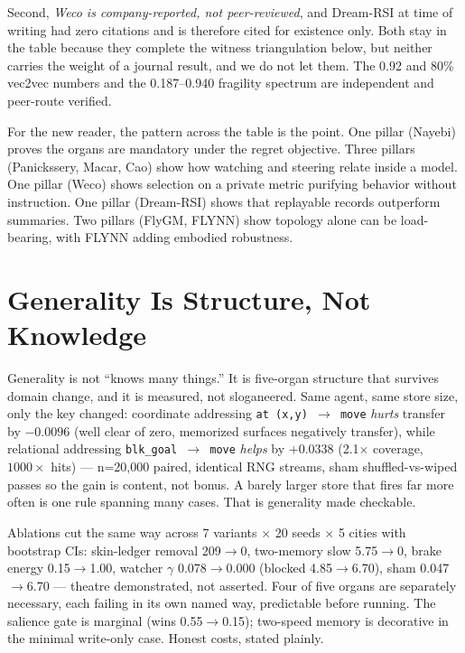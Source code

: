 Second, \textit{Weco is company-reported, not peer-reviewed}, and Dream-RSI at time of writing had zero citations and is therefore cited for existence only. Both stay in the table because they complete the witness triangulation below, but neither carries the weight of a journal result, and we do not let them. The 0.92 and 80\% vec2vec numbers and the 0.187--0.940 fragility spectrum are independent and peer-route verified.

For the new reader, the pattern across the table is the point. One pillar (Nayebi) proves the organs are mandatory under the regret objective. Three pillars (Panickssery, Macar, Cao) show how watching and steering relate inside a model. One pillar (Weco) shows selection on a private metric purifying behavior without instruction. One pillar (Dream-RSI) shows that replayable records outperform summaries. Two pillars (FlyGM, FLYNN) show topology alone can be load-bearing, with FLYNN adding embodied robustness.

\section{Generality Is Structure, Not Knowledge}
\label{sec:ch09-generality}

Generality is not ``knows many things.'' It is five-organ structure that survives domain change, and it is measured, not sloganeered. Same agent, same store size, only the key changed: coordinate addressing \texttt{at (x,y) $\to$ move} \textit{hurts} transfer by $-0.0096$ (well clear of zero, memorized surfaces negatively transfer), while relational addressing \texttt{blk\_goal $\to$ move} \textit{helps} by $+0.0338$ (2.1$\times$ coverage, $1000\times$ hits) --- n=20,000 paired, identical RNG streams, sham shuffled-vs-wiped passes so the gain is content, not bonus. A barely larger store that fires far more often is one rule spanning many cases. That is generality made checkable.

Ablations cut the same way across 7 variants $\times$ 20 seeds $\times$ 5 cities with bootstrap CIs: skin-ledger removal 209$\to$0, two-memory slow 5.75$\to$0, brake energy 0.15$\to$1.00, watcher $\gamma$ 0.078$\to$0.000 (blocked 4.85$\to$6.70), sham 0.047$\to$6.70 --- theatre demonstrated, not asserted. Four of five organs are separately necessary, each failing in its own named way, predictable before running. The salience gate is marginal (wins 0.55$\to$0.15); two-speed memory is decorative in the minimal write-only case. Honest costs, stated plainly.

